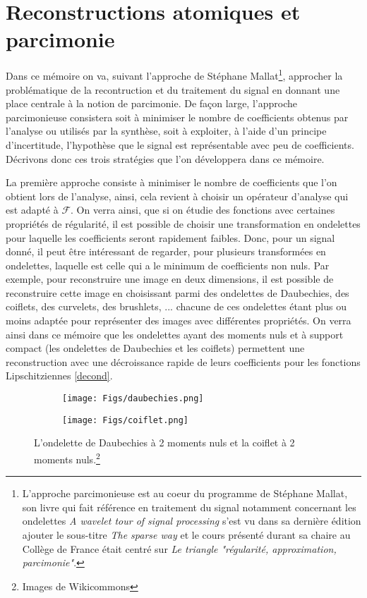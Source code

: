 \section{Reconstructions atomiques et parcimonie}
Dans ce mémoire on va, suivant l'approche de Stéphane Mallat\footnote{L'approche parcimonieuse est au coeur du programme de Stéphane Mallat, son livre qui fait référence en traitement du signal notamment concernant les ondelettes \emph{A wavelet tour of signal processing} s'est vu dans sa dernière édition ajouter le sous-titre \emph{The sparse way} et le cours présenté durant sa chaire au Collège de France était centré sur \emph{Le triangle "régularité, approximation, parcimonie"}.},
approcher la problématique de la recontruction et du traitement du signal en donnant une place centrale à la notion de parcimonie.
De façon large, l'approche parcimonieuse consistera soit à minimiser le nombre de coefficients obtenus par l'analyse ou utilisés par la synthèse, soit à exploiter, à l'aide d'un principe d'incertitude, l'hypothèse que le signal est représentable avec peu de coefficients.
Décrivons donc ces trois stratégies que l'on développera dans ce mémoire.
\newline

La première approche consiste à minimiser le nombre de coefficients que l'on obtient lors de l'analyse, ainsi, cela revient à choisir un opérateur d'analyse qui est adapté à $\mathcal{F}$.
On verra ainsi, que si on étudie des fonctions avec certaines propriétés de régularité, il est possible de choisir une transformation en ondelettes pour laquelle les coefficients seront rapidement faibles. 
Donc, pour un signal donné, il peut être intéressant de regarder, pour plusieurs transformées en ondelettes, laquelle est celle qui a le minimum de coefficients non nuls.
Par exemple, pour reconstruire une image en deux dimensions, il est possible de reconstruire cette image en choisissant parmi des ondelettes de Daubechies, des coiflets, des curvelets, des brushlets, ...
chacune de ces ondelettes étant plus ou moins adaptée pour représenter des images avec différentes propriétés.
On verra ainsi dans ce mémoire que les ondelettes ayant des moments nuls et à support compact (les ondelettes de Daubechies et les coiflets) permettent une reconstruction avec une décroissance rapide de leurs coefficients pour les fonctions Lipschitziennes \ref{decond}.

\begin{figure}[h]%
\centering
\begin{subfigure}{.5\textwidth}
  \centering
  \texttt{[image: Figs/daubechies.png]}
  \label{fig:sub1}
\end{subfigure}%
\begin{subfigure}{.5\textwidth}
  \centering
  \texttt{[image: Figs/coiflet.png]}
  \label{fig:sub2}
\end{subfigure}
	\caption{L'ondelette de Daubechies à 2 moments nuls et la coiflet à 2 moments nuls.\footnote{Images de Wikicommons}}
\label{fig:test}
\end{figure}

